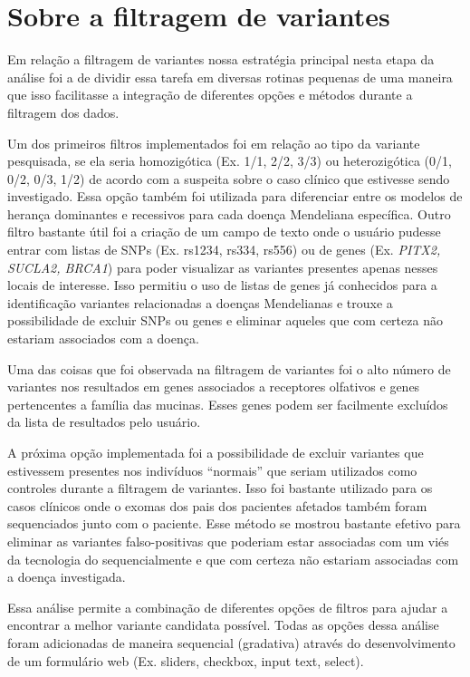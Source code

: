 \section{Sobre a filtragem de variantes}

Em relação a filtragem de variantes nossa estratégia principal nesta etapa da análise foi a de dividir essa tarefa em diversas rotinas pequenas de uma maneira que isso facilitasse a integração de diferentes opções e métodos durante a filtragem dos dados. 

Um dos primeiros filtros implementados foi em relação ao tipo da variante pesquisada, se ela seria homozigótica (Ex. 1/1, 2/2, 3/3) ou heterozigótica (0/1, 0/2, 0/3, 1/2) de acordo com a suspeita sobre o caso clínico que estivesse sendo investigado. Essa opção também foi utilizada para diferenciar entre os modelos de herança dominantes e recessivos para cada doença Mendeliana específica. Outro filtro bastante útil foi a criação de um campo de texto onde o usuário pudesse entrar com listas de SNPs (Ex. rs1234, rs334, rs556) ou de genes (Ex. \textit{PITX2, SUCLA2, BRCA1}) para poder visualizar as variantes presentes apenas nesses locais de interesse. Isso permitiu o uso de listas de genes já conhecidos para a identificação variantes relacionadas a doenças Mendelianas e trouxe a possibilidade de excluir SNPs ou genes e eliminar aqueles que com certeza não estariam associados com a doença. 

Uma das coisas que foi observada na filtragem de variantes foi o alto número de variantes nos resultados em genes associados a receptores olfativos e genes pertencentes a família das mucinas. Esses genes podem ser facilmente excluídos da lista de resultados pelo usuário.

A próxima opção implementada foi a possibilidade de excluir variantes que estivessem presentes nos indivíduos ``normais'' que seriam utilizados como controles durante a filtragem de variantes. Isso foi bastante utilizado para os casos clínicos onde o exomas dos pais dos pacientes afetados também foram sequenciados junto com o paciente. Esse método se mostrou bastante efetivo para eliminar as variantes falso-positivas que poderiam estar associadas com um viés da tecnologia do sequencialmente e que com certeza não estariam associadas com a doença investigada.

Essa análise permite a combinação de diferentes opções de filtros para ajudar a encontrar a melhor variante candidata possível. Todas as opções dessa análise foram adicionadas de maneira sequencial (gradativa) através do desenvolvimento de um formulário web (Ex. sliders, checkbox, input text, select).

